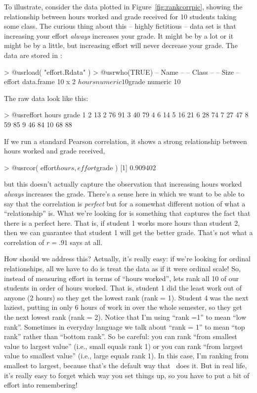 To illustrate, consider the data plotted in Figure~\ref{fig:rankcorrpic}, showing the relationship between hours worked and grade received for 10 students taking some class. The curious thing about this -- highly fictitious -- data set is that increasing your effort {\it always} increases your grade. It might be by a lot or it might be by a little, but increasing effort will never decrease your grade. The data are stored in :
\begin{rblock1}
> @usr{load( "effort.Rdata" )}
> @usr{who(TRUE)}
   -- Name --   -- Class --   -- Size --
   effort       data.frame    10 x 2    
    $hours      numeric       10        
    $grade      numeric       10        
\end{rblock1}
The raw data look like this:
\begin{rblock1}
> @usr{effort}
   hours grade
1      2    13
2     76    91
3     40    79
4      6    14
5     16    21
6     28    74
7     27    47
8     59    85
9     46    84
10    68    88
\end{rblock1}
If we run a standard Pearson correlation, it shows a strong relationship between hours worked and grade received,
\begin{rblock1}
> @usr{cor( effort$hours, effort$grade )}
[1] 0.909402
\end{rblock1}
but this doesn't actually capture the observation that increasing hours worked {\it always} increases the grade. There's a sense here in which we want to be able to say that the correlation is {\it perfect} but for a somewhat different notion of what a ``relationship'' is. What we're looking for is something that captures the fact that there is a perfect  here. That is, if student 1 works more hours than student 2, then we can guarantee that student 1 will get the better grade. That's not what a correlation of $r = .91$ says at all.

How should we address this? Actually, it's really easy: if we're looking for ordinal relationships, all we have to do is treat the data as if it were ordinal scale! So, instead of measuring effort in terms of ``hours worked'', lets rank all 10 of our students in order of hours worked. That is, student 1 did the least work out of anyone (2 hours) so they get the lowest rank (rank = 1). Student 4 was the next laziest, putting in only  6 hours of work in over the whole semester, so they get the next lowest rank (rank = 2). Notice that I'm using ``rank =1'' to mean ``low rank''. Sometimes in everyday language we talk about ``rank = 1'' to mean ``top rank'' rather than ``bottom rank''. So be careful: you can rank ``from smallest value to largest value'' (i.e., small equals rank 1) or you can rank ``from largest value to smallest value'' (i.e., large equals rank 1). In this case, I'm ranking from smallest to largest, because that's the default way that \R\ does it. But in real life, it's really easy to forget which way you set things up, so you have to put a bit of effort into remembering! 

